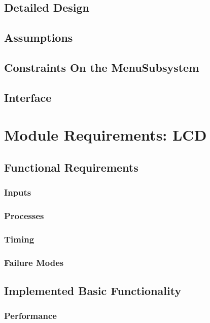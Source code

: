 \documentclass[]{report}
\begin{document}
\subsection{Detailed Design}

\subsection{Assumptions}

\subsection{Constraints On the MenuSubsystem}

\subsection{Interface}

\section{Module Requirements: LCD}
\subsection{Functional Requirements}
\subsubsection{Inputs}

\subsubsection{Processes}

\subsubsection{Timing}

\subsubsection{Failure Modes}

\subsection{Implemented Basic Functionality}
\subsubsection{Performance}
\end{document}
